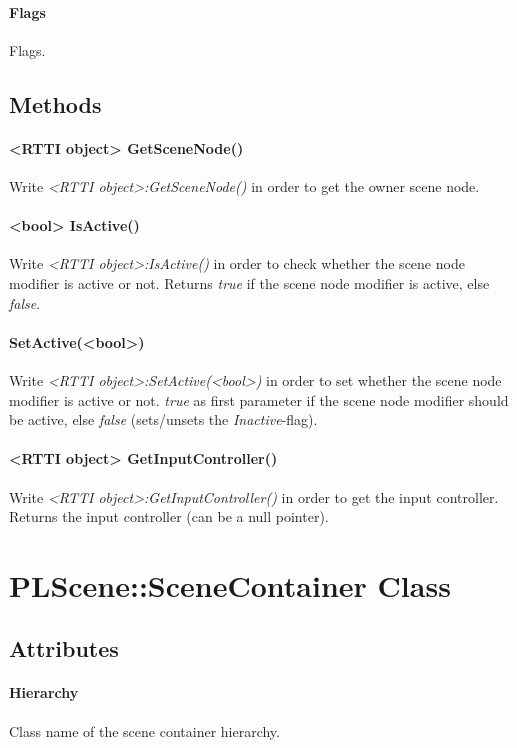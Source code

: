 \paragraph{Flags}
Flags.


\subsection{Methods}

\paragraph{<RTTI object> GetSceneNode()}
Write \emph{<RTTI object>:GetSceneNode()} in order to get the owner scene node.

\paragraph{<bool> IsActive()}
Write \emph{<RTTI object>:IsActive()} in order to check whether the scene node modifier is active or not. Returns \emph{true} if the scene node modifier is active, else \emph{false}.

\paragraph{SetActive(<bool>)}
Write \emph{<RTTI object>:SetActive(<bool>)} in order to set whether the scene node modifier is active or not. \emph{true} as first parameter if the scene node modifier should be active, else \emph{false} (sets/unsets the \emph{Inactive}-flag).

\paragraph{<RTTI object> GetInputController()}
Write \emph{<RTTI object>:GetInputController()} in order to get the input controller. Returns the input controller (can be a null pointer).




\section{PLScene::SceneContainer Class}


\subsection{Attributes}

\paragraph{Hierarchy}
Class name of the scene container hierarchy.

